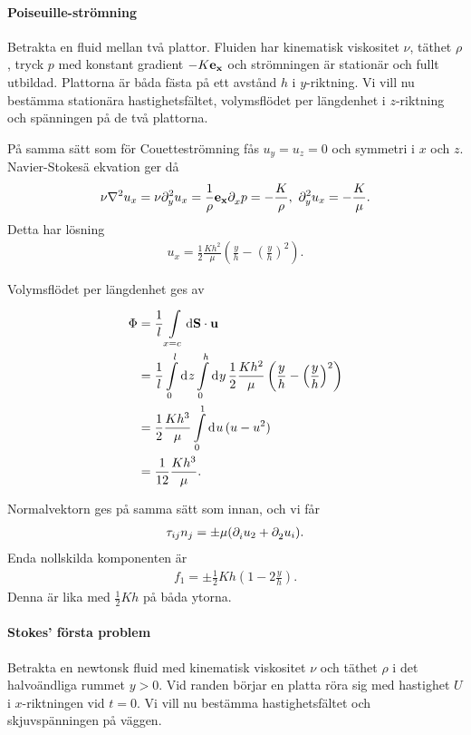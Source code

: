 \paragraph{Poiseuille-strömning}
Betrakta en fluid mellan två plattor. Fluiden har kinematisk viskositet $\nu$, täthet $\rho$, tryck $p$ med konstant gradient $-K\vb{e}_{\vb{x}}$ och strömningen är stationär och fullt utbildad. Plattorna är båda fästa på ett avstånd $h$ i $y$-riktning. Vi vill nu bestämma stationära hastighetsfältet, volymsflödet per längdenhet i $z$-riktning och spänningen på de två plattorna.

På samma sätt som för Couetteströmning fås $u_{y} = u_{z} = 0$ och symmetri i $x$ och $z$. Navier-Stokesä ekvation ger då
\begin{align*}
	\nu\laplacian{u_{x}} = \nu\del[2]{y}{u_{x}} = \frac{1}{\rho}\ub{x}\del{x}{p} = -\frac{K}{\rho},\ \del[2]{y}{u_{x}} = -\frac{K}{\mu}.
\end{align*}
Detta har lösning
\begin{align*}
	u_{x} = \frac{1}{2}\frac{Kh^{2}}{\mu}\left(\frac{y}{h} - \left(\frac{y}{h}\right)^{2}\right).
\end{align*}

Volymsflödet per längdenhet ges av
\begin{align*}
	\Phi &= \frac{1}{l}\int\limits_{x = c}^{}\dd{\vb{S}}\cdot \vb{u} \\
	     &= \frac{1}{l}\int\limits_{0}^{l}\dd[]{z}\int\limits_{0}^{h}\dd[]{y}\frac{1}{2}\frac{Kh^{2}}{\mu}\left(\frac{y}{h} - \left(\frac{y}{h}\right)^{2}\right) \\
	     &= \frac{1}{2}\frac{Kh^{3}}{\mu}\int\limits_{0}^{1}\dd[]{u}(u - u^{2}) \\
	     &= \frac{1}{12}\frac{Kh^{3}}{\mu}.
\end{align*}

Normalvektorn ges på samma sätt som innan, och vi får
\begin{align*}
	\tau_{ij}n_{j} = \pm\mu(\partial_{i}^{}u_{2} + \partial_{2}^{}u_{i}).
\end{align*}
Enda nollskilda komponenten är
\begin{align*}
	f_{1} = \pm\frac{1}{2}Kh\left(1 - 2\frac{y}{h}\right).
\end{align*}
Denna är lika med $\frac{1}{2}Kh$ på båda ytorna.

\paragraph{Stokes' första problem}
Betrakta en newtonsk fluid med kinematisk viskositet $\nu$ och täthet $\rho$ i det halvoändliga rummet $y > 0$. Vid randen börjar en platta röra sig med hastighet $U$ i $x$-riktningen vid $t = 0$. Vi vill nu bestämma hastighetsfältet och skjuvspänningen på väggen.


